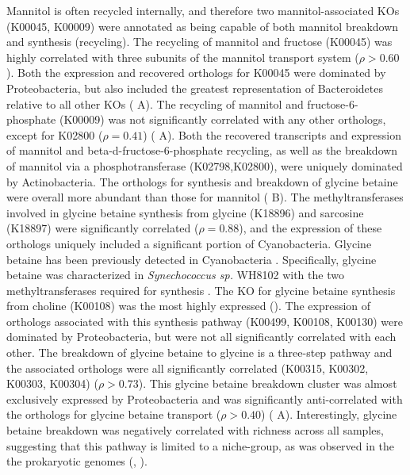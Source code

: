 \documentclass[utf8]{frontiersSCNS} %
\begin{document}
Mannitol is often recycled internally, and therefore two mannitol-associated KOs (K00045, K00009) were annotated as being capable of both mannitol breakdown and synthesis (recycling). The recycling of mannitol and fructose (K00045) was highly correlated with three subunits of the mannitol transport system ($\rho > 0.60$). Both the expression and recovered orthologs for K00045 were dominated by Proteobacteria, but also included the greatest representation of Bacteroidetes relative to all other KOs ( A). The recycling of mannitol and fructose-6-phosphate (K00009) was not significantly correlated with any other orthologs, except for K02800 ($\rho = 0.41$) ( A). Both the recovered transcripts and expression of mannitol and beta-d-fructose-6-phosphate recycling, as well as the breakdown of mannitol via a phosphotransferase (K02798,K02800), were uniquely dominated by Actinobacteria.
The orthologs for synthesis and breakdown of glycine betaine were overall more abundant than those for mannitol ( B). The methyltransferases involved in glycine betaine synthesis from glycine (K18896) and sarcosine (K18897) were significantly correlated ($\rho=0.88$), and the expression of these orthologs uniquely included a significant portion of Cyanobacteria. Glycine betaine has been previously detected in Cyanobacteria \citep{Fiore2015,Heal2020.12.22.424086}. Specifically, glycine betaine was characterized in \emph{Synechococcus sp.} WH8102 with the two methyltransferases required for synthesis \citep{Lu2006}. The KO for glycine betaine synthesis from choline (K00108) was the most highly expressed (). The expression of orthologs associated with this synthesis pathway (K00499, K00108, K00130) were dominated by Proteobacteria, but were not all significantly correlated with each other. The breakdown of glycine betaine to glycine is a three-step pathway and the associated orthologs were all significantly correlated (K00315, K00302, K00303, K00304) ($\rho > 0.73$). This glycine betaine breakdown cluster was almost exclusively expressed by Proteobacteria and was significantly anti-correlated with the orthologs for glycine betaine transport ($\rho > 0.40$) ( A). Interestingly, glycine betaine breakdown was negatively correlated with richness across all samples, suggesting that this pathway is limited to a niche-group, as was observed in the the prokaryotic genomes (, ).
\end{document}
